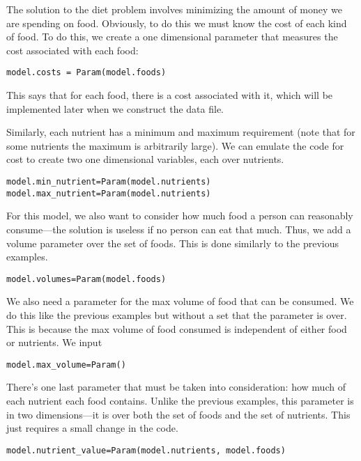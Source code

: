 \documentclass{article}
\begin{document}
The solution to the diet problem involves minimizing the amount of money we are spending on food.  Obviously, to do this we must know the cost of each kind of food.  To do this, we create a one dimensional parameter that measures the cost associated with each food:

\begin{verbatim}model.costs = Param(model.foods)\end{verbatim}

\noindent
This says that for each food, there is a cost associated with it, which will be implemented later when we construct the data file.

Similarly, each nutrient has a minimum and maximum requirement (note that for some nutrients the maximum is arbitrarily large).  We can emulate the code for cost to create two one dimensional variables, each over nutrients.

\begin{verbatim}model.min_nutrient=Param(model.nutrients)
model.max_nutrient=Param(model.nutrients)\end{verbatim}

For this model, we also want to consider how much food a person can reasonably consume---the solution is useless if no person can eat that much.  Thus, we add a volume parameter over the set of foods.  This is done similarly to the previous examples.

\begin{verbatim}model.volumes=Param(model.foods)\end{verbatim}

We also need a parameter for the max volume of food that can be consumed.  We do this like the previous examples but without a set that the parameter is over.  This is because the max volume of food consumed is independent of either food or nutrients.  We input

\begin{verbatim}model.max_volume=Param()\end{verbatim}

There's one last parameter that must be taken into consideration: how much of each nutrient each food contains.  Unlike the previous examples, this parameter is in two dimensions---it is over both the set of foods and the set of nutrients.  This just requires a small change in the code.

\begin{verbatim}model.nutrient_value=Param(model.nutrients, model.foods) \end{verbatim}
\end{document}
